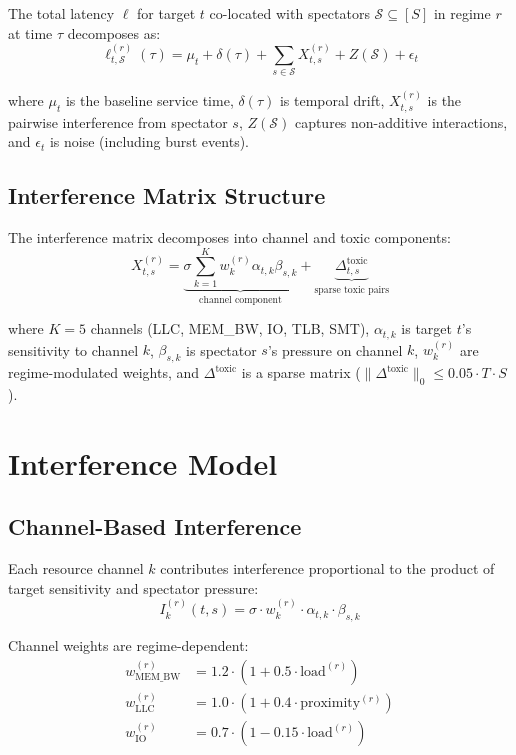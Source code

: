 \documentclass[11pt,twocolumn]{article}
\begin{document}
The total latency $\ell$ for target $t$ co-located with spectators
$\mathcal{S} \subseteq [S]$ in regime $r$ at time $\tau$ decomposes as:
\begin{equation}
\ell_{t,\mathcal{S}}^{(r)}(\tau) = \mu_t + \delta(\tau) + \sum_{s \in \mathcal{S}} X_{t,s}^{(r)} + Z(\mathcal{S}) + \epsilon_t
\end{equation}

where $\mu_t$ is the baseline service time, $\delta(\tau)$ is temporal
drift, $X_{t,s}^{(r)}$ is the pairwise interference from spectator $s$,
$Z(\mathcal{S})$ captures non-additive interactions, and $\epsilon_t$ is
noise (including burst events).

\subsection{Interference Matrix Structure}

The interference matrix decomposes into channel and toxic components:
\begin{equation}
X_{t,s}^{(r)} = \underbrace{\sigma \sum_{k=1}^{K} w_k^{(r)} \alpha_{t,k} \beta_{s,k}}_{\text{channel component}} + \underbrace{\Delta_{t,s}^{\text{toxic}}}_{\text{sparse toxic pairs}}
\end{equation}

where $K=5$ channels (LLC, MEM\_BW, IO, TLB, SMT), $\alpha_{t,k}$ is
target $t$'s sensitivity to channel $k$, $\beta_{s,k}$ is spectator $s$'s
pressure on channel $k$, $w_k^{(r)}$ are regime-modulated weights, and
$\Delta^{\text{toxic}}$ is a sparse matrix ($\|\Delta^{\text{toxic}}\|_0 \leq 0.05 \cdot T \cdot S$).

\section{Interference Model}

\subsection{Channel-Based Interference}

Each resource channel $k$ contributes interference proportional to the
product of target sensitivity and spectator pressure:
\begin{equation}
I_k^{(r)}(t, s) = \sigma \cdot w_k^{(r)} \cdot \alpha_{t,k} \cdot \beta_{s,k}
\end{equation}

Channel weights are regime-dependent:
\begin{align}
w_{\text{MEM\_BW}}^{(r)} &= 1.2 \cdot (1 + 0.5 \cdot \text{load}^{(r)}) \\
w_{\text{LLC}}^{(r)} &= 1.0 \cdot (1 + 0.4 \cdot \text{proximity}^{(r)}) \\
w_{\text{IO}}^{(r)} &= 0.7 \cdot (1 - 0.15 \cdot \text{load}^{(r)})
\end{align}
\end{document}
